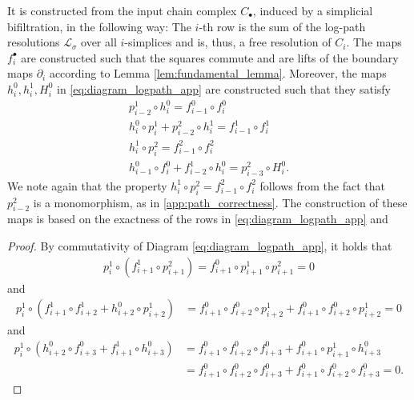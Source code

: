 \documentclass[a4paper,UKenglish,cleveref,nolineno,autoref]{socg-lipics-v2021}
\begin{document}
It is constructed from the input chain complex $C_\bullet$, induced by a simplicial bifiltration, in the following way: The $i$-th row is the sum of the log-path resolutions $\mathcal{L}_\sigma$ over all $i$-simplices and is, thus, a free resolution of $C_i$. The maps $f_i^\bullet$ are constructed such that the squares commute and are lifts of the boundary maps $\partial_i$ according to Lemma \ref{lem:fundamental_lemma}. Moreover, the maps $h^0_i,h^1_i,H^0_i$ in \eqref{eq:diagram_logpath_app} are constructed such that they satisfy
\begin{equation} \label{eq:map_properties}
\begin{aligned}
p_{i-2}^1\circ h^0_i=f^0_{i-1}\circ f^0_{i} \\
h^0_i\circ p^1_i + p^2_{i-2}\circ h^1_i = f^1_{i-1}\circ f^1_i \\ 
h^1_i\circ p_i^2=f^2_{i-1}\circ f^2_{i} \\
h^0_{i-1} \circ f^0_i + f^1_{i-2}\circ h^0_{i} =p^2_{i-3}\circ H_i^0 .
\end{aligned}
\end{equation}
We note again that the property $h^1_i\circ p_i^2=f^2_{i-1}\circ f^2_{i}$ follows from the fact that $p_{i-2}^2$ is a monomorphism, as in \ref{app:path_correctness}. The construction of these maps is based on the exactness of the rows in \eqref{eq:diagram_logpath_app} and


\begin{proof}%
    By commutativity of Diagram \ref{eq:diagram_logpath_app}, it holds that
    \begin{equation*}
     \begin{split}
          p^1_i\circ (f^1_{i+1}\circ p^2_{i+1})=f_{i+1}^0\circ p_{i+1}^1\circ p_{i+1}^2=0 
     \end{split}
    \end{equation*}
    and
    \begin{equation*}
     \begin{split}
            p^1_{i}\circ (f^1_{i+1}\circ f^1_{i+2} + h^0_{i+2}\circ p^1_{i+2}) & = f^0_{i+1}\circ f^0_{i+2} \circ p^1_{i+2} + f_{i+1}^0\circ f_{i+2}^0 \circ p^1_{i+2} = 0
    \end{split}
    \end{equation*}
    and
    \begin{equation*}
    \begin{split}
    p^1_{i}\circ(h^0_{i+2}\circ f^0_{i+3} + f^1_{i+1} \circ h^0_{i+3}) &= f_{i+1}^0\circ f_{i+2}^0\circ f_{i+3}^0+f_{i+1}^0\circ p_{i+1}^1\circ h_{i+3}^0 \\ & = f_{i+1}^0\circ f_{i+2}^0\circ f_{i+3}^0+f_{i+1}^0\circ f_{i+2}^0\circ f_{i+3}^0=0 .
    \end{split}
    \end{equation*}
\end{proof}
\end{document}
